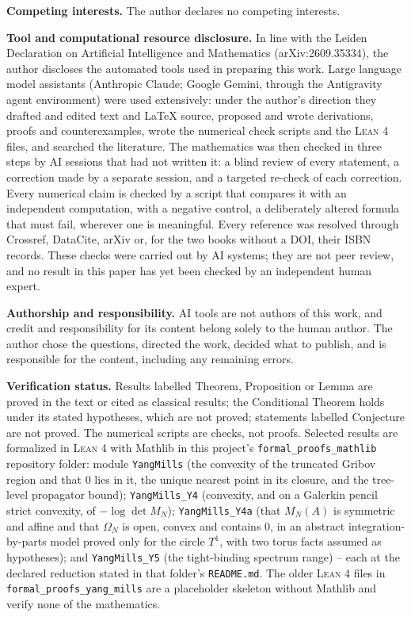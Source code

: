 \documentclass[11pt,a4paper]{amsart}
\theoremstyle{definition}
\begin{document}
\medskip\noindent\textbf{Competing interests.} The author declares no competing interests.

\medskip\noindent\textbf{Tool and computational resource disclosure.} In line with
the Leiden Declaration on Artificial Intelligence and Mathematics
(arXiv:2609.35334), the author discloses the automated tools used in preparing
this work. Large language model assistants (Anthropic Claude; Google Gemini,
through the Antigravity agent environment) were used extensively: under the
author's direction they drafted and edited text and \LaTeX{} source, proposed and
wrote derivations, proofs and counterexamples, wrote the numerical check scripts
and the \textsc{Lean 4} files, and searched the literature. The mathematics was
then checked in three steps by AI sessions that had not written it: a blind
review of every statement, a correction made by a separate session, and a
targeted re-check of each correction. Every numerical claim is checked by a
script that compares it with an independent computation, with a negative
control, a deliberately altered formula that must fail, wherever one is
meaningful. Every reference was resolved through Crossref, DataCite, arXiv or,
for the two books without a DOI, their ISBN records. These checks were carried
out by AI systems; they are not peer review, and no result in this paper has
yet been checked by an independent human expert.

\medskip\noindent\textbf{Authorship and responsibility.} AI tools are not
authors of this work, and credit and responsibility for its content belong
solely to the human author. The author chose the questions, directed the work,
decided what to publish, and is responsible for the content, including any
remaining errors.

\medskip\noindent\textbf{Verification status.} Results labelled Theorem,
Proposition or Lemma are proved in the text or cited as classical results;
the Conditional Theorem holds under its stated hypotheses, which are not proved;
statements labelled Conjecture are not proved. The numerical scripts are checks,
not proofs. Selected results are formalized in \textsc{Lean 4} with Mathlib in
this project's \texttt{formal\_proofs\_mathlib} repository folder: module
\texttt{YangMills} (the convexity of the truncated Gribov region and that $0$
lies in it, the unique nearest point in its closure, and the tree-level
propagator bound); \texttt{YangMills\_Y4} (convexity, and on a Galerkin pencil
strict convexity, of $-\log\det M_N$); \texttt{YangMills\_Y4a} (that $M_N(A)$ is
symmetric and affine and that $\Omega_N$ is open, convex and contains $0$, in an
abstract integration-by-parts model proved only for the circle $T^1$, with two
torus facts assumed as hypotheses); and \texttt{YangMills\_Y5} (the
tight-binding spectrum range) -- each at the declared reduction stated in that
folder's \texttt{README.md}. The older \textsc{Lean 4} files in
\texttt{formal\_proofs\_yang\_mills} are a placeholder skeleton without Mathlib
and verify none of the mathematics.
\end{document}
